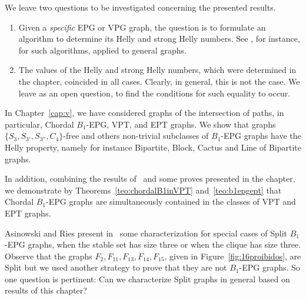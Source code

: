 \normalsize

We leave two questions to be investigated concerning the presented results.

\begin{enumerate}
\item Given a {\it specific}  EPG or VPG graph, the question is to formulate an algorithm to determine its Helly and strong Helly numbers. See \cite{dourado2008improved}, for instance, for such algorithms, applied to general graphs. 

\item The values of the Helly and strong Helly numbers, which were determined in the chapter, coincided in all cases. Clearly, in general, this is not the case. We leave as an open question, to find the conditions for such equality to occur. \end{enumerate}


In Chapter~\ref{cap:v},  we have considered graphs of the intersection of paths, in particular, Chordal $B_1$-EPG, VPT, and EPT graphs. We show that graphs $\{S_3, S_{3'},S_{3''},C_4\}$-free and others non-trivial subclasses of  $B_1$-EPG graphs have the Helly property, namely for instance Bipartite, Block, Cactus and Line of Bipartite graphs. 
  
  In addition, combining the results of~\cite{alcon2014recognizing,Asinowski2009, golumbic2009} and some proves  presented in the chapter, we demonstrate by  Theorems~\ref{teo:chordalB1inVPT} and~\ref{teo:b1epgept} that Chordal $B_1$-EPG graphs are simultaneously contained in the classes of VPT and EPT graphs.  
 
 

Asinowski and Ries present in~\cite{ries2009} some characterization for special cases of Split $B_1$-EPG graphs, when the stable set has size three or when the clique has size three. Observe that the graphs $F_2, F_{11}, F_{13}, F_{14}, F_{15}$, given in Figure~\ref{fig:16proibidos}, are Split but we used another strategy to prove that they are not $B_1$-EPG graphs. So one question is pertinent: Can we characterize Split graphs in general based on results of this chapter? 

